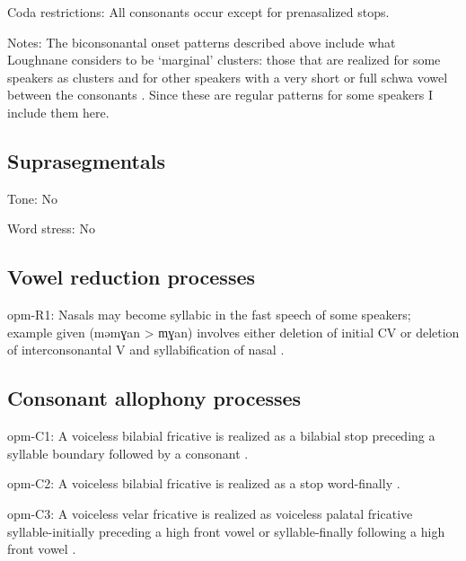 {\begin{appendixdesc}
\item[Coda restrictions:] All consonants occur except for prenasalized stops.

\item[Notes:] The biconsonantal onset patterns described above include what Loughnane considers to be ‘marginal’ clusters: those that are realized for some speakers as clusters and for other speakers with a very short or full schwa vowel between the consonants \citep[64--65]{Loughnane2009}. Since these are regular patterns for some speakers I include them here.
\end{appendixdesc}
\subsection*{Suprasegmentals}
\begin{appendixdesc}
\item[Tone:] No

\item[Word stress:] No
\end{appendixdesc}
\subsection*{Vowel reduction processes}
\begin{appendixdesc}

\item[opm-R1:] Nasals may become syllabic in the fast speech of some speakers; example given (məmɣan > m̩ɣan) involves either deletion of initial CV or deletion of interconsonantal V and syllabification of nasal \citep[64]{Loughnane2009}.
\end{appendixdesc}
\subsection*{Consonant allophony processes}
\begin{appendixdesc}

\item[opm-C1:] A voiceless bilabial fricative is realized as a bilabial stop preceding a syllable boundary followed by a consonant \citep[33]{Loughnane2009}.

\item[opm-C2:] A voiceless bilabial fricative is realized as a stop word-finally \citep[33]{Loughnane2009}.

\item[opm-C3:] A voiceless velar fricative is realized as voiceless palatal fricative syllable-initially preceding a high front vowel or syllable-finally following a high front vowel \citep[42]{Loughnane2009}.


\end{appendixdesc}}
